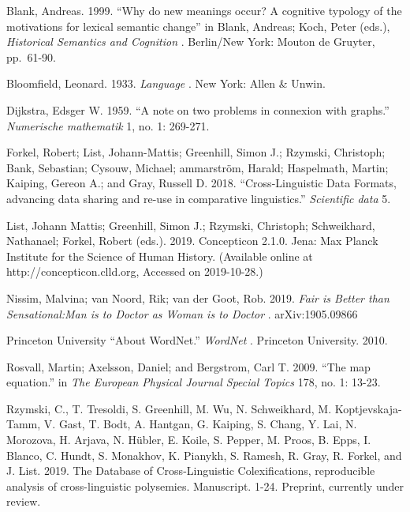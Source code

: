 \documentclass[
  a4paper,
  14pt,
  oneside,
  tablecaptionabove
]{scrbook}
\begin{document}
\nopagebreak\hangindent=0.7cm {\small Blank, Andreas. 1999. \enquote{Why do new meanings occur? A
cognitive typology of the motivations for lexical semantic change} in
Blank, Andreas; Koch, Peter (eds.), \emph{Historical Semantics and
Cognition} . Berlin/New York: Mouton de Gruyter, pp.~61-90. }

\nopagebreak\hangindent=0.7cm {\small Bloomfield, Leonard. 1933. \emph{Language} . New York: Allen \&
Unwin. }

\nopagebreak\hangindent=0.7cm {\small Dijkstra, Edsger W. 1959. \enquote{A note on two problems in
connexion with graphs.} \emph{Numerische mathematik} 1, no. 1:
269-271. }

\nopagebreak\hangindent=0.7cm {\small Forkel, Robert; List, Johann-Mattis; Greenhill, Simon J.; Rzymski,
Christoph; Bank, Sebastian; Cysouw, Michael; ammarström, Harald;
Haspelmath, Martin; Kaiping, Gereon A.; and Gray, Russell D. 2018.
\enquote{Cross-Linguistic Data Formats, advancing data sharing and
re-use in comparative linguistics.} \emph{Scientific data} 5. }

\nopagebreak\hangindent=0.7cm {\small List, Johann Mattis; Greenhill, Simon J.; Rzymski, Christoph;
Schweikhard, Nathanael; Forkel, Robert (eds.). 2019. Concepticon 2.1.0.
Jena: Max Planck Institute for the Science of Human History. (Available
online at http://concepticon.clld.org, Accessed on 2019-10-28.) }

\nopagebreak\hangindent=0.7cm {\small Nissim, Malvina; van Noord, Rik; van der Goot, Rob. 2019. \emph{Fair
is Better than Sensational:Man is to Doctor as Woman is to Doctor} .
arXiv:1905.09866 }


\nopagebreak\hangindent=0.7cm {\small Princeton University \enquote{About WordNet.} \emph{WordNet} .
Princeton University. 2010. }

\nopagebreak\hangindent=0.7cm {\small Rosvall, Martin; Axelsson, Daniel; and Bergstrom, Carl T. 2009.
\enquote{The map equation.} in \emph{The European Physical Journal
Special Topics} 178, no. 1: 13-23. }

\nopagebreak\hangindent=0.7cm {\small Rzymski, C., T. Tresoldi, S. Greenhill, M. Wu, N. Schweikhard, M.
Koptjevskaja-Tamm, V. Gast, T. Bodt, A. Hantgan, G. Kaiping, S. Chang,
Y. Lai, N. Morozova, H. Arjava, N. Hübler, E. Koile, S. Pepper, M.
Proos, B. Epps, I. Blanco, C. Hundt, S. Monakhov, K. Pianykh, S. Ramesh,
R. Gray, R. Forkel, and J. List. 2019. The Database of Cross-Linguistic
Colexifications, reproducible analysis of cross-linguistic polysemies.
Manuscript. 1-24. Preprint, currently under review. }
\end{document}
